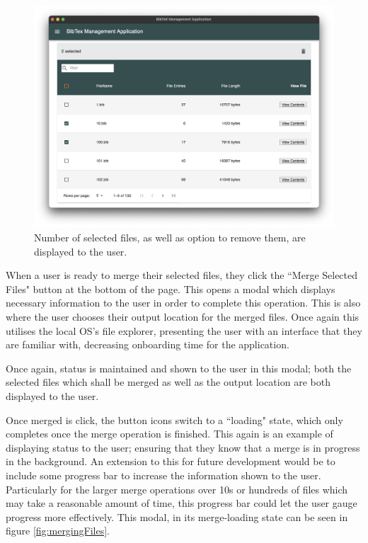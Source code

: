\documentclass[a4paper,11pt]{article}
\begin{document}
\begin{figure}
    \centering
    \includegraphics[width=0.8\linewidth]{images/selection.png}
    \caption{Number of selected files, as well as option to remove them, are displayed to the user.}
    \label{fig:selection}
\end{figure}

When a user is ready to merge their selected files, they click the ``Merge Selected Files" button at the bottom of the page. This opens a modal which displays necessary information to the user in order to complete this operation. This is also where the user chooses their output location for the merged files. Once again this utilises the local OS's file explorer, presenting the user with an interface that they are familiar with, decreasing onboarding time for the application.

Once again, status is maintained and shown to the user in this modal; both the selected files which shall be merged as well as the output location are both displayed to the user.

Once merged is click, the button icons switch to a ``loading" state, which only completes once the merge operation is finished. This again is an example of displaying status to the user; ensuring that they know that a merge is in progress in the background. An extension to this for future development would be to include some progress bar to increase the information shown to the user. Particularly for the larger merge operations over 10s or hundreds of files which may take a reasonable amount of time, this progress bar could let the user gauge progress more effectively. This modal, in its merge-loading state can be seen in figure \ref{fig:mergingFiles}.
\end{document}
